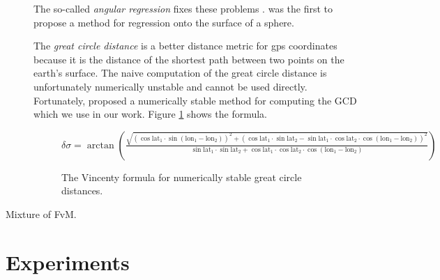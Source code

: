 \documentclass[sigconf,10pt]{acmart}
\newcommand{\lata}{\text{lat}_1}
\newcommand{\latb}{\text{lat}_2}
\newcommand{\lona}{\text{lon}_1}
\newcommand{\lonb}{\text{lon}_2}
\newcommand{\lond}{(\lona-\lonb)}
\begin{document}
\begin{description}
The so-called \emph{angular regression} fixes these problems \citep{fisher1992regression}.
\citet{fisher1992regression} was the first to propose a method for regression onto the surface of a sphere.

The \emph{great circle distance} is a better distance metric for gps coordinates because it is the distance of the shortest path between two points on the earth's surface.
The naive computation of the great circle distance is unfortunately numerically unstable and cannot be used directly.
Fortunately, \citet{vincenty1975direct} proposed a numerically stable method for computing the GCD which we use in our work.
Figure \ref{fig:vincenty} shows the formula.

\begin{figure}
    \centering
    $
    \displaystyle
        \delta\sigma 
        =
        \arctan\left(
            \frac
            {\sqrt{(\cos\lata\cdot\sin\lond)^2 + (\cos\lata\cdot\sin\latb-\sin\lata\cdot\cos\latb\cdot\cos\lond)^2}}
            {\sin\lata\cdot\sin\latb + \cos\lata\cdot\cos\latb\cdot\cos\lond}
        \right)
    $
    \caption{The Vincenty formula for numerically stable great circle distances.}
    \label{fig:vincenty}
\end{figure}

\item[Mixture of FvM.]

\end{description}

\newpage
\section{Experiments}
\label{sec:experiments}


\end{document}
